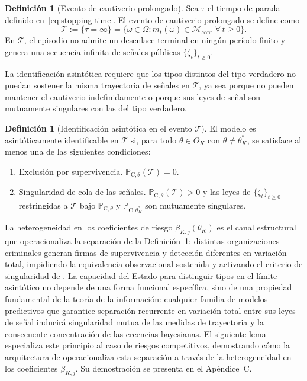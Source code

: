 \documentclass[review,authoryear,12pt]{elsarticle}
\theoremstyle{plain}
\theoremstyle{definition}
\newtheorem{definition}[theorem]{Definición}
\newcommand{\ProbC}[1]{\mathbb{P}_{\mathrm{C},#1}}
\newcommand{\ThetaK}{\Theta_K}
\newcommand{\1}{\mathbf{1}}
\begin{document}
\begin{definition}[Evento de cautiverio prolongado]\label{def:event-T-long}
Sea $\tau$ el tiempo de parada definido en~\eqref{eq:stopping-time}. El evento de cautiverio prolongado se define como
\[
\mathcal{T}:=\{\tau=\infty\}=\bigl\{\omega\in\Omega:m_t(\omega)\in\mathcal{M}_{\mathrm{cont}}\;\forall\,t\ge 0\bigr\}.
\]
En $\mathcal{T}$, el episodio no admite un desenlace terminal en ningún período finito y genera una secuencia infinita de señales públicas $\{\zeta_t\}_{t\ge 0}$.
\end{definition}

La identificación asintótica requiere que los tipos distintos del tipo verdadero no puedan sostener la misma trayectoria de señales en $\mathcal{T}$, ya sea porque no pueden mantener el cautiverio indefinidamente o porque sus leyes de señal son mutuamente singulares con las del tipo verdadero.

\begin{definition}[Identificación asintótica en el evento $\mathcal{T}$]\label{def:asymptotic-id}
El modelo es asintóticamente identificable en $\mathcal{T}$ si, para todo $\theta\in\ThetaK$ con $\theta\neq\theta_K^\ast$, se satisface al menos una de las siguientes condiciones:
\begin{enumerate}
  \item[\textup{(a)}] Exclusión por supervivencia. $\ProbC{\theta}(\mathcal{T})=0$.
  \item[\textup{(b)}] Singularidad de cola de las señales. $\ProbC{\theta}(\mathcal{T})>0$ y las leyes de $\{\zeta_t\}_{t\ge 0}$ restringidas a $\mathcal{T}$ bajo $\ProbC{\theta}$ y $\ProbC{\theta_K^\ast}$ son mutuamente singulares.
\end{enumerate}
\end{definition}

La heterogeneidad en los coeficientes de riesgo $\beta_{K,j}(\theta_K)$ es el canal estructural que operacionaliza la separación de la Definición~\ref{def:asymptotic-id}: distintas organizaciones criminales generan firmas de supervivencia y detección diferentes en variación total, impidiendo la equivalencia observacional sostenida y activando el criterio de singularidad de \citet{Kakutani1948}. La capacidad del Estado para distinguir tipos en el límite asintótico no depende de una forma funcional específica, sino de una propiedad fundamental de la teoría de la información: cualquier familia de modelos predictivos que garantice separación recurrente en variación total entre sus leyes de señal inducirá singularidad mutua de las medidas de trayectoria y la consecuente concentración de las creencias bayesianas. El siguiente lema especializa este principio al caso de riesgos competitivos, demostrando cómo la arquitectura de \citet{Cox1972} operacionaliza esta separación a través de la heterogeneidad en los coeficientes $\beta_{K,j}$. Su demostración se presenta en el Apéndice~C.
\end{document}
